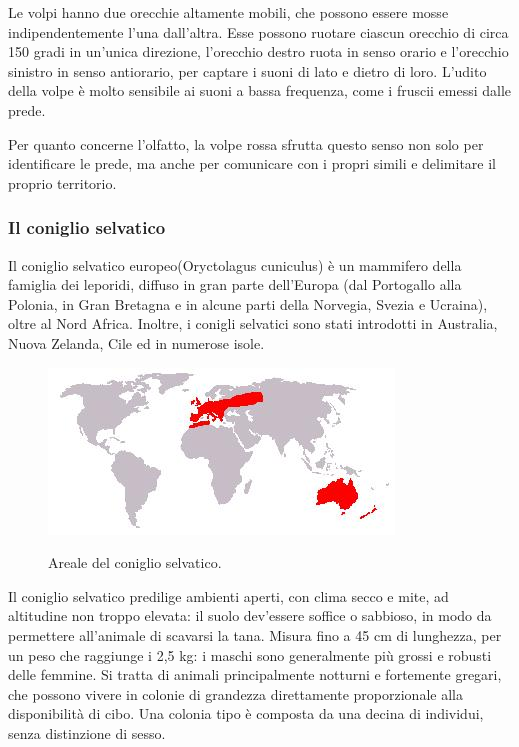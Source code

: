 \documentclass[11pt]{article}
\begin{document}
Le volpi hanno due orecchie altamente mobili, che possono essere mosse indipendentemente l'una dall'altra. Esse possono ruotare ciascun orecchio di circa 150 gradi in un'unica direzione, l'orecchio destro ruota in senso orario e l'orecchio sinistro in senso antiorario, per captare i suoni di lato e dietro di loro. L'udito della volpe è molto sensibile ai suoni a bassa frequenza, come i fruscii emessi dalle prede. 

Per quanto concerne l'olfatto, la volpe rossa sfrutta questo senso non solo per identificare le prede, ma anche per comunicare con i propri simili e delimitare il proprio territorio.



\subsubsection{Il coniglio selvatico}
\label{coniglio}
Il coniglio selvatico\cite{WikiConiglio} europeo(Oryctolagus cuniculus) è un mammifero della famiglia dei leporidi, diffuso in gran parte dell'Europa (dal Portogallo alla Polonia, in Gran Bretagna e in alcune parti della Norvegia, Svezia e Ucraina), oltre al Nord Africa. Inoltre, i conigli selvatici sono stati introdotti in  Australia, Nuova Zelanda, Cile ed in numerose isole. 

\begin{figure}[h]
    \centering
    \includegraphics[scale = 1]{ArealeDelConiglioSelvatico.jpeg}
    \label{figArealeConiglio}
    \caption{Areale del coniglio selvatico.}
\end{figure}

Il coniglio selvatico predilige ambienti aperti, con clima secco e mite, ad altitudine non troppo elevata: il suolo dev'essere soffice o sabbioso, in modo da permettere all'animale di scavarsi la tana. Misura fino a 45 cm di lunghezza, per un peso che raggiunge i 2,5 kg: i maschi sono generalmente più grossi e robusti delle femmine. Si tratta di animali principalmente notturni e fortemente gregari, che possono vivere in colonie di grandezza direttamente proporzionale alla disponibilità di cibo. Una colonia tipo è composta da una decina di individui, senza distinzione di sesso. 
\end{document}
